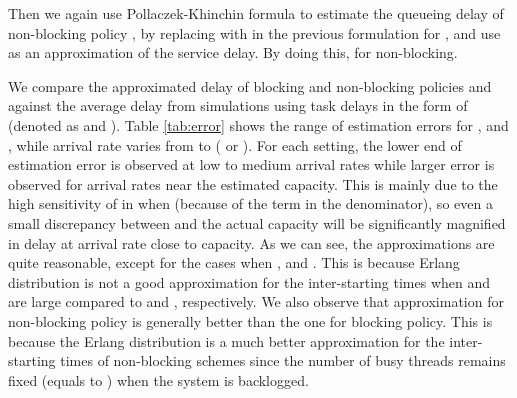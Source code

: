 \documentclass[journal]{IEEEtran}
\begin{document}
Then we again use Pollaczek-Khinchin formula to estimate the queueing delay of non-blocking policy , by replacing  with  in the previous formulation for , and use  as an approximation of the service delay. By doing this,  for non-blocking. 

We compare the approximated delay of blocking and non-blocking policies  and  against the average delay from simulations using  task delays in the form of  (denoted as  and ). 
Table \ref{tab:error} shows the range of estimation errors for ,  and , while arrival rate varies from  to  ( or ). 
For each setting, the lower end of estimation error is observed at low to medium arrival rates while larger error is observed for arrival rates near the estimated capacity. This is mainly due to the high sensitivity of  in   when   (because of the   term in the denominator), so even a small discrepancy between  and the actual capacity will be significantly magnified in delay at arrival rate close to capacity. 
As we can see, the approximations are quite reasonable, except for the cases when ,  and . This is because Erlang distribution is not a good approximation for the inter-starting times when  and  are large compared to  and , respectively.
We also observe that approximation for non-blocking policy is generally better than the one for blocking policy. 
This is because the Erlang distribution is a much better approximation for the inter-starting times of non-blocking schemes since the number of busy threads remains fixed (equals to ) when the system is backlogged.
\end{document}
